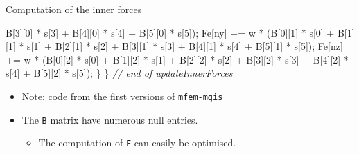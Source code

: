 \documentclass{beamer}
\providecommand{\tightlist}{%
  \setlength{\itemsep}{0pt}\setlength{\parskip}{0pt}}
\newenvironment{Shaded}{}{}
\newcommand{\CommentTok}[1]{\textcolor[rgb]{0.38,0.63,0.69}{\textit{#1}}}
\newcommand{\DecValTok}[1]{\textcolor[rgb]{0.25,0.63,0.44}{#1}}
\newcommand{\NormalTok}[1]{#1}
\begin{document}
\begin{frame}[fragile]{Computation of the inner forces}
\begin{Shaded}
\begin{Highlighting}[]
\NormalTok{                     B[}\DecValTok{3}\NormalTok{][}\DecValTok{0}\NormalTok{] * s[}\DecValTok{3}\NormalTok{] + B[}\DecValTok{4}\NormalTok{][}\DecValTok{0}\NormalTok{] * s[}\DecValTok{4}\NormalTok{] + B[}\DecValTok{5}\NormalTok{][}\DecValTok{0}\NormalTok{] * s[}\DecValTok{5}\NormalTok{]);}
\NormalTok{      Fe[ny] += w * (B[}\DecValTok{0}\NormalTok{][}\DecValTok{1}\NormalTok{] * s[}\DecValTok{0}\NormalTok{] + B[}\DecValTok{1}\NormalTok{][}\DecValTok{1}\NormalTok{] * s[}\DecValTok{1}\NormalTok{] + B[}\DecValTok{2}\NormalTok{][}\DecValTok{1}\NormalTok{] * s[}\DecValTok{2}\NormalTok{] +}
\NormalTok{                     B[}\DecValTok{3}\NormalTok{][}\DecValTok{1}\NormalTok{] * s[}\DecValTok{3}\NormalTok{] + B[}\DecValTok{4}\NormalTok{][}\DecValTok{1}\NormalTok{] * s[}\DecValTok{4}\NormalTok{] + B[}\DecValTok{5}\NormalTok{][}\DecValTok{1}\NormalTok{] * s[}\DecValTok{5}\NormalTok{]);}
\NormalTok{      Fe[nz] += w * (B[}\DecValTok{0}\NormalTok{][}\DecValTok{2}\NormalTok{] * s[}\DecValTok{0}\NormalTok{] + B[}\DecValTok{1}\NormalTok{][}\DecValTok{2}\NormalTok{] * s[}\DecValTok{1}\NormalTok{] + B[}\DecValTok{2}\NormalTok{][}\DecValTok{2}\NormalTok{] * s[}\DecValTok{2}\NormalTok{] +}
\NormalTok{                     B[}\DecValTok{3}\NormalTok{][}\DecValTok{2}\NormalTok{] * s[}\DecValTok{3}\NormalTok{] + B[}\DecValTok{4}\NormalTok{][}\DecValTok{2}\NormalTok{] * s[}\DecValTok{4}\NormalTok{] + B[}\DecValTok{5}\NormalTok{][}\DecValTok{2}\NormalTok{] * s[}\DecValTok{5}\NormalTok{]);}
\NormalTok{    \}}
\NormalTok{  \}  }\CommentTok{// end of updateInnerForces}
\end{Highlighting}
\end{Shaded}

\begin{itemize}
\tightlist
\item
  Note: code from the first versions of \texttt{mfem-mgis}
\item
  The \texttt{B} matrix have numerous null entries.

  \begin{itemize}
  \tightlist
  \item
    The computation of \texttt{F} can easily be optimised.
  \end{itemize}
\end{itemize}
\end{frame}
\end{document}
